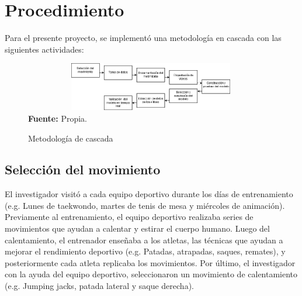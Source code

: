 \section{Procedimiento}
Para el presente proyecto, se implement\'o una metodolog\'ia en cascada con las siguientes  actividades:
\begin{figure}[H]
	\caption{Metodolog\'ia de cascada}
	\label{fig:segVideo}
	\centering
	\includegraphics[width=420px,height=80px]{graphics/cascada.PNG} \\
	\textbf{Fuente:} Propia.
\end{figure} 
\subsection{Selecci\'on del movimiento}
El investigador visit\'o a cada equipo deportivo durante los d\'ias de entrenamiento (e.g. Lunes de taekwondo, martes de tenis de mesa y mi\'ercoles de animaci\'on).  Previamente al entrenamiento, el equipo deportivo realizaba series de movimientos que ayudan a calentar y estirar el cuerpo humano.  Luego del calentamiento, el entrenador ense\~naba a los atletas, las t\'ecnicas que ayudan a mejorar el rendimiento deportivo (e.g. Patadas, atrapadas, saques, remates), y posteriormente cada atleta replicaba los movimientos. Por \'ultimo, el investigador con la ayuda del equipo deportivo, seleccionaron un movimiento de calentamiento (e.g. Jumping jacks, patada lateral y saque derecha).

